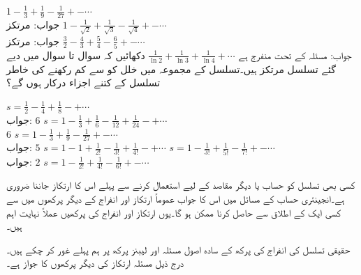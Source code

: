 \quad
$1-\tfrac{1}{3}+\tfrac{1}{9}-\tfrac{1}{27}+-\cdots$\\
جواب:\quad
مرتکز
\quad
$1-\tfrac{1}{\sqrt{2}}+\tfrac{1}{\sqrt{3}}-\tfrac{1}{\sqrt{4}}+-\cdots$\\
جواب:\quad
مرتکز
\quad
$\tfrac{3}{2}-\tfrac{4}{3}+\tfrac{5}{4}-\tfrac{6}{5}+-\cdots$\\
جواب:\quad
مسئلہ  کے تحت منفرج  ہے
\quad
$\tfrac{1}{\ln 2}+\tfrac{1}{\ln 3}+\tfrac{1}{\ln 4}+\cdots$
دکھائیں کہ سوال  تا سوال  میں دیے گئے تسلسل مرتکز ہیں۔تسلسل کے مجموعہ  میں خلل  کو  سے کم رکھنے کی خاطر تسلسل کے کتنے اجزاء درکار ہوں گے؟

\quad
$s=\tfrac{1}{2}-\tfrac{1}{4}+\tfrac{1}{8}-+\cdots$\\
جواب:\quad 
$6$
\quad
$s=1-\tfrac{1}{3}+\tfrac{1}{6}-\tfrac{1}{12}+\tfrac{1}{24}-+\cdots$\\
$6$
\quad
$s=1-\tfrac{1}{3}+\tfrac{1}{9}-\tfrac{1}{27}+-\cdots$\\
جواب:\quad
$5$
\quad
$s=1-1+\tfrac{1}{2!}-\tfrac{1}{3!}+\tfrac{1}{4!}-+\cdots$
\quad
$s=1-\tfrac{1}{3!}+\tfrac{1}{5!}-\tfrac{1}{7!}+-\cdots$\\
جواب:\quad
$2$
\quad
$s=1-\tfrac{1}{2!}+\tfrac{1}{4!}-\tfrac{1}{6!}+-\cdots$

کسی بھی تسلسل کو حساب یا دیگر مقاصد کے لیے استعمال کرنے سے پہلے اس کا ارتکاز جاننا ضروری ہے۔انجینئری حساب کے مسائل میں اس کا جواب عموماً ارتکاز اور انفراج کے دیگر پرکھوں میں سے کسی ایک کے اطلاق سے حاصل کرنا ممکن ہو گا۔یوں ارتکاز اور انفراج کی پرکھیں عملاً نہایت اہم ہیں۔

حقیقی تسلسل کی انفراج کی پرکھ کے سادہ اصول مسئلہ  اور لیبنز پرکھ پر ہم پہلے غور کر چکے ہیں۔ درج ذیل مسئلہ ارتکاز کی دیگر پرکھوں کا جواز ہے۔

